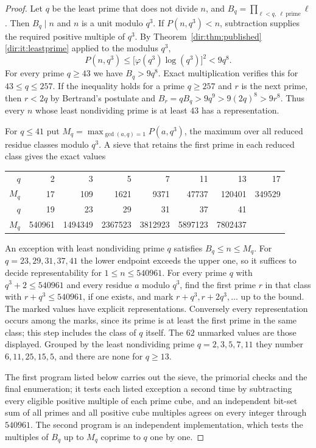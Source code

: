 \begin{proof}
Let $q$ be the least prime that does not divide $n$, and
$B_q=\prod_{\ell<q,\ \ell\ \mathrm{prime}}\ell$. Then $B_q\mid n$ and $n$ is a unit
modulo $q^3$. If $P(n,q^3)<n$, subtraction supplies the required positive multiple of
$q^3$. By Theorem~\ref{dir:thm:published}\ref{dir:it:leastprime} applied to the modulus $q^3$,
\[
 P(n,q^3)\le\bigl[\varphi(q^3)\log(q^3)\bigr]^2<9q^8 .
\]
For every prime $q\ge43$ we have $B_q>9q^8$. Exact multiplication verifies this for
$43\le q\le257$. If the inequality holds for a prime $q\ge257$ and $r$ is the next
prime, then $r<2q$ by Bertrand's postulate and
$B_r=qB_q>9q^9>9(2q)^8>9r^8$. Thus every $n$ whose least nondividing prime is at least
$43$ has a representation.

For $q\le41$ put $M_q=\max_{\gcd(a,q)=1}P(a,q^3)$, the maximum over all reduced residue
classes modulo $q^3$. A sieve that retains the first prime in each reduced class gives
the exact values
\begin{center}
\begin{tabular}{r|rrrrrrr}
$q$ &2&3&5&7&11&13&17\\
$M_q$&17&109&1621&9371&47737&120401&349529\\ \hline
$q$&19&23&29&31&37&41&\\
$M_q$&540961&1494349&2367523&3812923&5897123&7802437&
\end{tabular}
\end{center}
An exception with least nondividing prime $q$ satisfies $B_q\le n\le M_q$. For
$q=23,29,31,37,41$ the lower endpoint exceeds the upper one, so it suffices to decide
representability for $1\le n\le540961$. For every prime $q$ with $q^3+2\le540961$ and
every residue $a$ modulo $q^3$, find the first prime $r$ in that class with
$r+q^3\le540961$, if one exists, and mark $r+q^3,r+2q^3,\dots$ up to the bound. The
marked values have explicit representations. Conversely every representation occurs
among the marks, since its prime is at least the first prime in the same class; this
step includes the class of $q$ itself. The $62$ unmarked values are those displayed.
Grouped by the least nondividing prime $q=2,3,5,7,11$ they number $6,11,25,15,5$, and
there are none for $q\ge13$.

The first program listed below carries out the sieve, the primorial checks and the
final enumeration; it tests each listed exception a second time by subtracting every
eligible positive multiple of each prime cube, and an independent bit-set sum of all
primes and all positive cube multiples agrees on every integer through $540961$. The
second program is an independent implementation, which tests the multiples of $B_q$ up
to $M_q$ coprime to $q$ one by one.
\end{proof}

